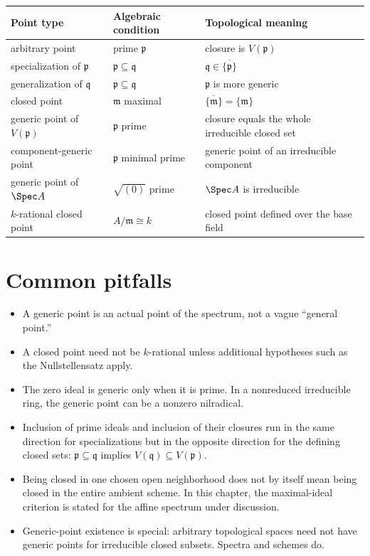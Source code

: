 \begin{center}
\renewcommand{\arraystretch}{1.22}
\begin{tabular}{p{}p{}p{}}
\toprule
\textbf{Point type} & \textbf{Algebraic condition} & \textbf{Topological meaning}\\
\midrule
arbitrary point & prime $\mathfrak p$ & closure is $V(\mathfrak p)$\\
specialization of $\mathfrak p$ & $\mathfrak p\subseteq\mathfrak q$ & $\mathfrak q\in\overline{\{\mathfrak p\}}$\\
generalization of $\mathfrak q$ & $\mathfrak p\subseteq\mathfrak q$ & $\mathfrak p$ is more generic\\
closed point & $\mathfrak m$ maximal & $\overline{\{\mathfrak m\}}=\{\mathfrak m\}$\\
generic point of $V(\mathfrak p)$ & $\mathfrak p$ prime & closure equals the whole irreducible closed set\\
component-generic point & $\mathfrak p$ minimal prime & generic point of an irreducible component\\
generic point of $\Spec A$ & $\sqrt{(0)}$ prime & $\Spec A$ is irreducible\\
$k$-rational closed point & $A/\mathfrak m\cong k$ & closed point defined over the base field\\
\bottomrule
\end{tabular}
\end{center}

\section{Common pitfalls}

\begin{itemize}
\item A generic point is an actual point of the spectrum, not a vague ``general point.''
\item A closed point need not be $k$-rational unless additional hypotheses such as the
      Nullstellensatz apply.
\item The zero ideal is generic only when it is prime.  In a nonreduced irreducible ring,
      the generic point can be a nonzero nilradical.
\item Inclusion of prime ideals and inclusion of their closures run in the same direction
      for specializations but in the opposite direction for the defining closed sets:
      $\mathfrak p\subseteq\mathfrak q$ implies $V(\mathfrak q)\subseteq V(\mathfrak p)$.
\item Being closed in one chosen open neighborhood does not by itself mean being closed in
      the entire ambient scheme.  In this chapter, the maximal-ideal criterion is stated
      for the affine spectrum under discussion.
\item Generic-point existence is special: arbitrary topological spaces need not have
      generic points for irreducible closed subsets.  Spectra and schemes do.
\end{itemize}

